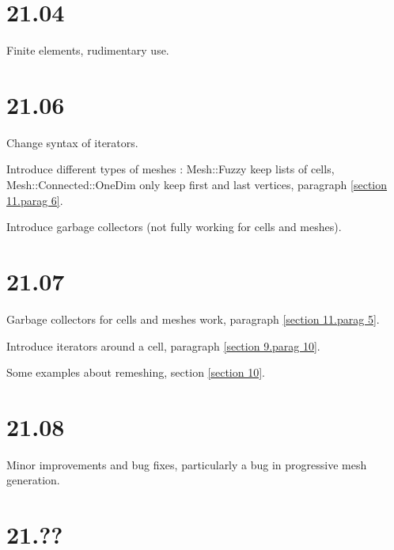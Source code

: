 \documentclass[a4paper]{scrreprt}
\def\numb{}
\newcommand\verm[1]{\textcolor{manif}{#1}}
\renewcommand\tt{\normalfont\ttfamily}
\begin{document}


















\section*{21.04}

\noindent Finite elements, rudimentary use.


\section*{21.06}

\noindent Change syntax of iterators.

\noindent Introduce different types of meshes :
{\small\tt\verm{Mesh}::Fuzzy} keep lists of cells,
{\small\tt\verm{Mesh}::Connected::OneDim} only keep first and last vertices,
paragraph \ref{\numb section 11.\numb parag 6}.

\noindent Introduce garbage collectors (not fully working for cells and meshes).


\section*{21.07}

\noindent Garbage collectors for cells and meshes work,
paragraph \ref{\numb section 11.\numb parag 5}.

\noindent Introduce iterators around a cell,
paragraph \ref{\numb section 9.\numb parag 10}.

\noindent Some examples about remeshing, section \ref{\numb section 10}.


\section*{21.08}

\noindent Minor improvements and bug fixes, particularly a bug in progressive mesh generation.


\section*{21.??}
\end{document}
